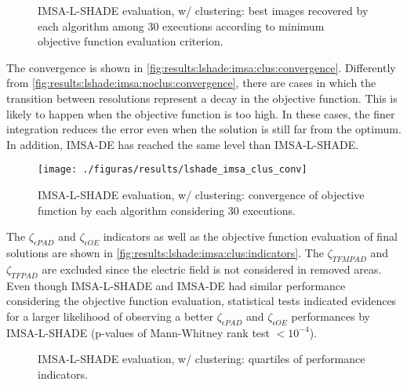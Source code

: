 			\begin{figure}
				\centering
				\caption[IMSA-L-SHADE evaluation, w/ clustering: best recovered images.]{IMSA-L-SHADE evaluation, w/ clustering: best images recovered by each algorithm among 30 executions according to minimum objective function evaluation criterion.}
				\label{fig:results:lshade:imsa:clus:images}
			\end{figure}
		
			The convergence is shown in \autoref{fig:results:lshade:imsa:clus:convergence}. Differently from \autoref{fig:results:lshade:imsa:noclus:convergence}, there are cases in which the transition between resolutions represent a decay in the objective function. This is likely to happen when the objective function is too high. In these cases, the finer integration reduces the error even when the solution is still far from the optimum. In addition, IMSA-DE has reached the same level than IMSA-L-SHADE.
		
			\begin{figure}
				\centering
				\texttt{[image: ./figuras/results/lshade\_imsa\_clus\_conv]}
				\caption[IMSA-L-SHADE evaluation, w/clustering: convergence.]{IMSA-L-SHADE evaluation, w/ clustering: convergence of objective function by each algorithm considering 30 executions.}
				\label{fig:results:lshade:imsa:clus:convergence}
			\end{figure}
		
			The $\zeta_{\epsilon PAD}$ and $\zeta_{\epsilon OE}$ indicators as well as the objective function evaluation of final solutions are shown in \autoref{fig:results:lshade:imsa:clus:indicators}. The $\zeta_{TFMPAD}$ and $\zeta_{TFPAD}$ are excluded since the electric field is not considered in removed areas. Even though IMSA-L-SHADE and IMSA-DE had similar performance considering the objective function evaluation, statistical tests indicated evidences for a larger likelihood of observing a better $\zeta_{\epsilon PAD}$ and $\zeta_{\epsilon OE}$ performances by IMSA-L-SHADE (p-values of Mann-Whitney rank test $<10^{-4}$).
			
			\begin{figure}
				\centering
				\caption[IMSA-L-SHADE evaluation, w/ clustering: indicators.]{IMSA-L-SHADE evaluation, w/ clustering: quartiles of performance indicators.}
				\label{fig:results:lshade:imsa:clus:indicators}
			\end{figure}
		
